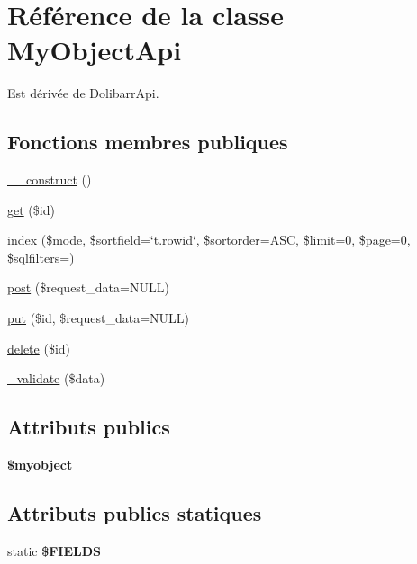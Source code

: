 \hypertarget{classMyObjectApi}{}\section{Référence de la classe My\+Object\+Api}
\label{classMyObjectApi}


Est dérivée de Dolibarr\+Api.

\subsection*{Fonctions membres publiques}
\begin{DoxyCompactItemize}
\item 
\hyperlink{classMyObjectApi_a5e74de160c05563852902219228cbc65}{\+\_\+\+\_\+construct} ()
\item 
\hyperlink{classMyObjectApi_a3d12b694a3b8b9c2a94043945ab54c35}{get} (\$id)
\item 
\hyperlink{classMyObjectApi_ab5297f0027ae5030ab0c791b823347bb}{index} (\$mode, \$sortfield=\char`\"{}t.\+rowid\char`\"{}, \$sortorder=\textquotesingle{}A\+SC\textquotesingle{}, \$limit=0, \$page=0, \$sqlfilters=\textquotesingle{}\textquotesingle{})
\item 
\hyperlink{classMyObjectApi_a8985b81edf7420b10680e8abd62a3765}{post} (\$request\+\_\+data=N\+U\+LL)
\item 
\hyperlink{classMyObjectApi_a0bd3291ecbc15391f6f88197a07c5646}{put} (\$id, \$request\+\_\+data=N\+U\+LL)
\item 
\hyperlink{classMyObjectApi_ac1e08e0702436b404e774e401603da8a}{delete} (\$id)
\item 
\hyperlink{classMyObjectApi_adb8789082fb8928fcd2adedef3f7a681}{\+\_\+validate} (\$data)
\end{DoxyCompactItemize}
\subsection*{Attributs publics}
\begin{DoxyCompactItemize}
\item 
\mbox{\label{classMyObjectApi_a3d6dab3a61dc166592044e0d64aea0af}} 
{\bfseries \$myobject}
\end{DoxyCompactItemize}
\subsection*{Attributs publics statiques}
\begin{DoxyCompactItemize}
\item 
static {\bfseries \$\+F\+I\+E\+L\+DS}
\end{DoxyCompactItemize}


